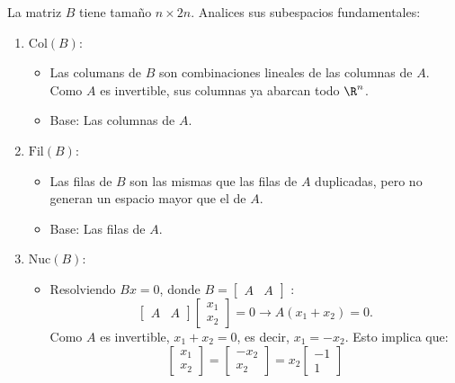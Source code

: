 \begin{enumerate}[label=\color{red}\textbf{\arabic*)}]
    La matriz $B$ tiene tamaño $n\times 2n$. Analices sus subespacios fundamentales:
    \begin{enumerate}[label=\arabic*)]
        \item $\mathrm{Col}(B)$:
            \begin{itemize}[label=\textbullet]
                \item Las columans de $B$ son combinaciones lineales de las columnas de $A$. Como $A$ es invertible, sus columnas ya abarcan todo  $\R^n$.
                \item Base: Las columnas de $A$.
            \end{itemize}
        \item $\mathrm{Fil}(B)$:
            \begin{itemize}[label=\textbullet]
                \item Las filas de $B$ son las mismas que las filas de $A$ duplicadas, pero no generan un espacio mayor que el de $A$.
                \item Base: Las filas de  $A$.
            \end{itemize}
        \item $\mathrm{Nuc}(B)$:
            \begin{itemize}[label=\textbullet]
                \item Resolviendo $Bx=0$, donde  $B=\begin{bmatrix} 
                        A & A 
                \end{bmatrix} $ :
                \[
                \begin{bmatrix} 
                    A & A 
                \end{bmatrix} \begin{bmatrix} 
                x_1\\ x_2 
                \end{bmatrix} =0\longrightarrow A(x_1+x_2)=0.
                \] 
                Como $A$ es invertible,  $x_1+x_2=0$, es decir, $x_1=-x_2$. Esto implica que: \[
                \begin{bmatrix} 
                x_1\\ x_2 
                \end{bmatrix} =\begin{bmatrix} 
                -x_2\\ x_2 
                \end{bmatrix} =x_2\begin{bmatrix} 
                -1\\ 1 

\end{bmatrix}\]
\end{itemize}
\end{enumerate}
\end{enumerate}
